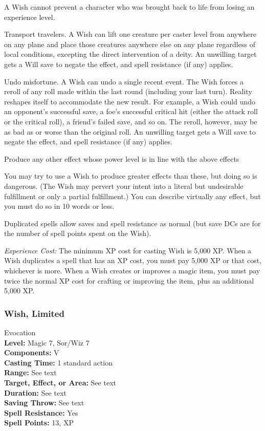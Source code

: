 \begin{list}{}{\leftmargin=1em}
  A Wish cannot prevent a character who was brought back to life from losing an experience level.
  \item Transport travelers. A Wish can lift one creature per caster level from anywhere on any plane and place those creatures anywhere else on any plane regardless of local conditions, 
  excepting the direct intervention of a deity. 
  An unwilling target gets a Will save to negate the effect, and spell resistance (if any) applies.
  \item Undo misfortune. A Wish can undo a single recent event. 
  The Wish forces a reroll of any roll made within the last round (including your last turn). 
  Reality reshapes itself to accommodate the new result. 
  For example, a Wish could undo an opponent's successful save, a foe's successful critical hit (either the attack roll or the critical roll), 
  a friend's failed save, and so on. The reroll, however, may be as bad as or worse than the original roll. 
  An unwilling target gets a Will save to negate the effect, and spell resistance (if any) applies.
  \item Produce any other effect whose power level is in line with the above effects
\end{list}
You may try to use a Wish to produce greater effects than these, but doing so is dangerous. 
(The Wish may pervert your intent into a literal but undesirable fulfillment or only a partial fulfillment.)
You can describe virtually any effect, but you must do so in 10 words or less.

Duplicated spells allow saves and spell resistance as normal (but save DCs are for the number of spell points spent on the Wish).

\emph{Experience Cost:} The minimum XP cost for casting Wish is 5,000 XP. 
When a Wish duplicates a spell that has an XP cost, you must pay 5,000 XP or that cost, whichever is more. 
When a Wish creates or improves a magic item, you must pay twice the normal XP cost for crafting or improving the item, plus an additional 5,000 XP. 

\subsubsection[Limited Wish]{Wish, Limited}
\label{Spell:LimitedWish}
Evocation
\\ \textbf{Level:} Magic 7, Sor/Wiz 7
\\ \textbf{Components:} V
\\ \textbf{Casting Time:} 1 standard action
\\ \textbf{Range:} See text
\\ \textbf{Target, Effect, or Area:} See text
\\ \textbf{Duration:} See text
\\ \textbf{Saving Throw:} See text
\\ \textbf{Spell Resistance:} Yes
\\ \textbf{Spell Points:} 13, XP

